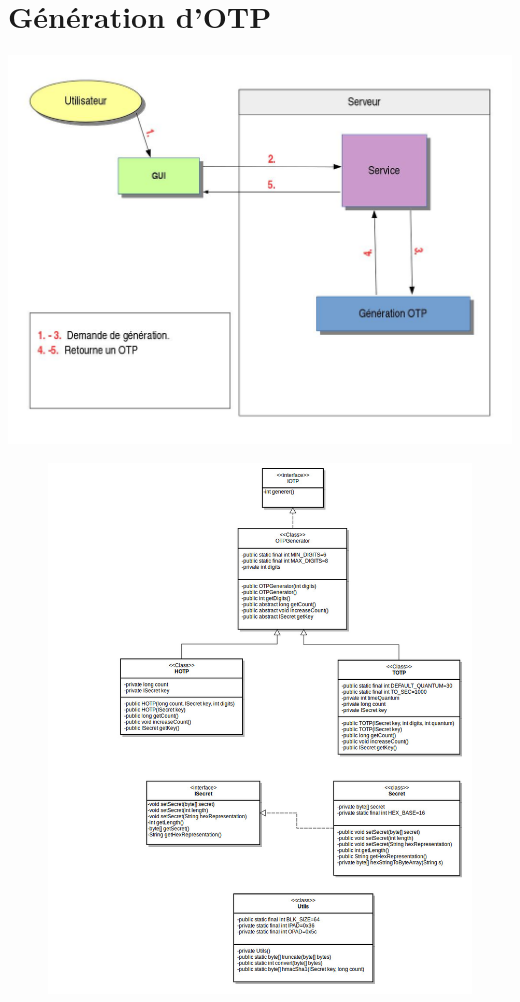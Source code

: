 \documentclass{"../../res/univ-projet"}
\begin{document}
\section{Génération d'OTP}
\includegraphics[width=\textwidth]{../graphics/generation.jpg}

\begin{figure}
\includegraphics[width=\textwidth]{../graphics/uml_lib.jpg}
\end{figure}
\end{document}
